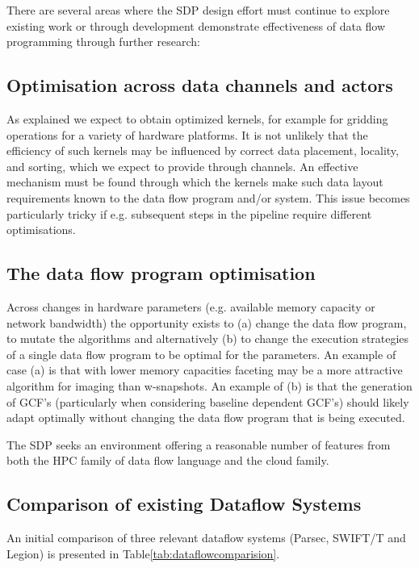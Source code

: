 \documentclass[11pt,a4paper]{article}
\begin{document}
There are several areas where the SDP design effort must continue to
explore existing work or through development demonstrate effectiveness
of data flow programming through further research:

\subsection{Optimisation across data channels and actors}

As explained we expect to obtain optimized kernels, for example for
gridding operations for a variety of hardware platforms.  It is not
unlikely that the efficiency of such kernels may be influenced by
correct data placement, locality, and sorting, which we expect to
provide through channels.  An effective mechanism must be found
through which the kernels make such data layout requirements known to
the data flow program and/or system. This issue becomes particularly
tricky if e.g. subsequent steps in the pipeline require different
optimisations.

\subsection{The data flow program optimisation}

Across changes in hardware parameters (e.g. available memory capacity
or network bandwidth) the opportunity exists to (a) change the data
flow program, to mutate the algorithms and alternatively (b) to change
the execution strategies of a single data flow program to be optimal
for the parameters.  An example of case (a) is that with lower memory
capacities faceting may be a more attractive algorithm for imaging
than w-snapshots.  An example of (b) is that the generation of GCF’s
(particularly when considering baseline dependent GCF’s) should likely
adapt optimally without changing the data flow program that is being
executed.

The SDP seeks an environment offering a reasonable number of features
from both the HPC family of data flow language and the cloud family.

\subsection{Comparison of  existing Dataflow Systems}

An initial comparison of three relevant dataflow systems (Parsec,
SWIFT/T and Legion) is presented in
Table\ref{tab:dataflowcomparision}.
\end{document}
